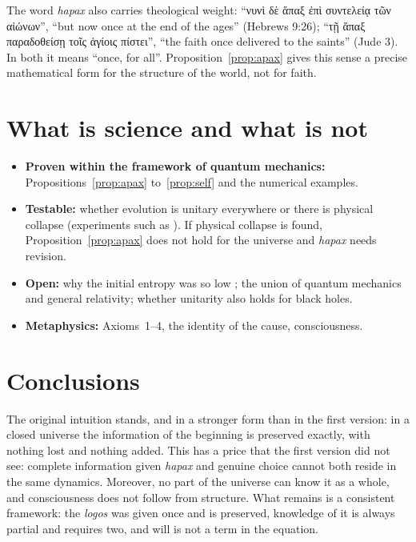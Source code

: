 \documentclass[a4paper,11pt]{article}
\theoremstyle{definition}
\begin{document}
The word \emph{hapax} also carries theological weight: ``νυνὶ δὲ ἅπαξ ἐπὶ συντελείᾳ τῶν αἰώνων'', ``but now once at the end of the ages'' (Hebrews 9:26); ``τῇ ἅπαξ παραδοθείσῃ τοῖς ἁγίοις πίστει'', ``the faith once delivered to the saints'' (Jude 3). In both it means ``once, for all''. Proposition~\ref{prop:apax} gives this sense a precise mathematical form for the structure of the world, not for faith.

\section{What is science and what is not}

\begin{itemize}
\item \textbf{Proven within the framework of quantum mechanics:} Propositions~\ref{prop:apax} to~\ref{prop:self} and the numerical examples.
\item \textbf{Testable:} whether evolution is unitary everywhere or there is physical collapse (experiments such as \cite{donadi}). If physical collapse is found, Proposition~\ref{prop:apax} does not hold for the universe and \emph{hapax} needs revision.
\item \textbf{Open:} why the initial entropy was so low \cite{penrose}; the union of quantum mechanics and general relativity; whether unitarity also holds for black holes.
\item \textbf{Metaphysics:} Axioms~1--4, the identity of the cause, consciousness.
\end{itemize}

\section{Conclusions}

The original intuition stands, and in a stronger form than in the first version: in a closed universe the information of the beginning is preserved exactly, with nothing lost and nothing added. This has a price that the first version did not see: complete information given \emph{hapax} and genuine choice cannot both reside in the same dynamics. Moreover, no part of the universe can know it as a whole, and consciousness does not follow from structure. What remains is a consistent framework: the \emph{logos} was given once and is preserved, knowledge of it is always partial and requires two, and will is not a term in the equation.
\end{document}
